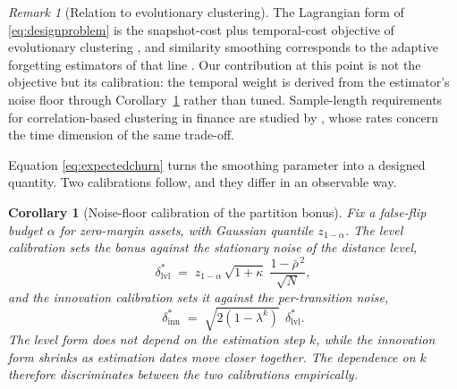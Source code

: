 \documentclass[11pt]{article}
\newtheorem{corollary}{Corollary}
\theoremstyle{remark}
\newtheorem{remark}{Remark}
\begin{document}
\begin{remark}[Relation to evolutionary clustering]
\label{rem:evolutionary}
The Lagrangian form of \eqref{eq:designproblem} is the snapshot-cost plus
temporal-cost objective of evolutionary clustering
\citep{chakrabarti2006evolutionary}, and similarity smoothing corresponds to
the adaptive forgetting estimators of that line \citep{xu2014adaptive}. Our
contribution at this point is not the objective but its calibration: the
temporal weight is derived from the estimator's noise floor through
Corollary~\ref{cor:delta} rather than tuned. Sample-length requirements for
correlation-based clustering in finance are studied by
\citet{marti2016clustering}, whose rates concern the time dimension of the
same trade-off.
\end{remark}

Equation \eqref{eq:expectedchurn} turns the smoothing parameter into a designed
quantity. Two calibrations follow, and they differ in an observable way.

\begin{corollary}[Noise-floor calibration of the partition bonus]
\label{cor:delta}
Fix a false-flip budget $\alpha$ for zero-margin assets, with Gaussian quantile
$z_{1-\alpha}$. The level calibration sets the bonus against the stationary
noise of the distance level,
\begin{equation}
\delta^{*}_{\mathrm{lvl}}
\;=\; z_{1-\alpha}\, \sqrt{1+\kappa}\; \frac{1-\bar{\rho}^{\,2}}{\sqrt{N}},
\label{eq:deltalevel}
\end{equation}
and the innovation calibration sets it against the per-transition noise,
\begin{equation}
\delta^{*}_{\mathrm{inn}}
\;=\; \sqrt{2\left(1-\lambda^{k}\right)}\;\, \delta^{*}_{\mathrm{lvl}}.
\label{eq:deltainnovation}
\end{equation}
The level form does not depend on the estimation step $k$, while the
innovation form shrinks as estimation dates move closer together. The
dependence on $k$ therefore discriminates between the two calibrations
empirically.
\end{corollary}

\end{document}
